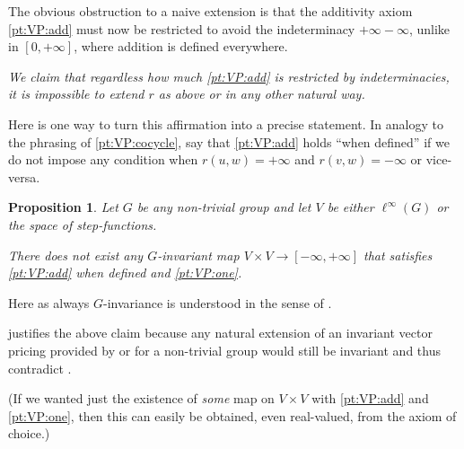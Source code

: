 \documentclass[11pt]{amsart}
\numberwithin{equation}{section}
\newtheorem{prop}[thm]{Proposition}
\theoremstyle{definition}
\theoremstyle{definition}
\begin{document}
The obvious obstruction to a naive extension is that the additivity axiom \ref{pt:VP:add} must now be restricted to avoid the indeterminacy $+\infty -\infty$, unlike in $[0, +\infty]$, where addition is defined everywhere.

\medskip\itshape
We claim that regardless how much \ref{pt:VP:add} is restricted by indeterminacies, it is impossible to extend $r$ as above or in any other natural way.\upshape

Here is one way to turn this affirmation into a precise statement. In analogy to the phrasing of \ref{pt:VP:cocycle}, say that \ref{pt:VP:add} holds ``when defined'' if we do not impose any condition when $r(u, w)=+\infty$ and $r(v, w)=-\infty$ or vice-versa.

\begin{prop}\label{prop:negative}
Let $G$ be any non-trivial group and let $V$ be either $\ell^\infty(G)$ or the space of step-functions.

There does not exist any $G$-invariant map $V\times V \to [-\infty, +\infty]$ that satisfies \ref{pt:VP:add} when defined and \ref{pt:VP:one}.
\end{prop}

Here as always $G$-invariance is understood in the sense of .

 justifies the above claim because any natural extension of an invariant vector pricing provided by  or  for a non-trivial group would still be invariant and thus contradict .

\smallskip
(If we wanted just the existence of \emph{some} map on $V\times V$ with \ref{pt:VP:add} and \ref{pt:VP:one}, then this can easily be obtained, even real-valued, from the axiom of choice.)
\end{document}
